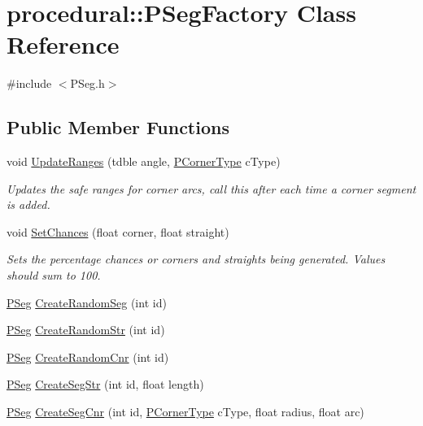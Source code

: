 \hypertarget{classprocedural_1_1_p_seg_factory}{\section{procedural\-:\-:P\-Seg\-Factory Class Reference}
\label{classprocedural_1_1_p_seg_factory}
}


{\ttfamily \#include $<$P\-Seg.\-h$>$}

\subsection*{Public Member Functions}
\begin{DoxyCompactItemize}
\item 
void \hyperlink{classprocedural_1_1_p_seg_factory_a5d5632c1b3713eccc14e1e1c8983492f}{Update\-Ranges} (tdble angle, \hyperlink{namespaceprocedural_ac5486560c59bdf79345a041628149e91}{P\-Corner\-Type} c\-Type)
\begin{DoxyCompactList}\small\item\em Updates the safe ranges for corner arcs, call this after each time a corner segment is added. \end{DoxyCompactList}\item 
void \hyperlink{classprocedural_1_1_p_seg_factory_acfcd1caeae5fdad541a44f18ad1918a3}{Set\-Chances} (float corner, float straight)
\begin{DoxyCompactList}\small\item\em Sets the percentage chances or corners and straights being generated. Values should sum to 100. \end{DoxyCompactList}\item 
\hyperlink{classprocedural_1_1_p_seg}{P\-Seg} \hyperlink{classprocedural_1_1_p_seg_factory_ac53d611538a7b868597f76db25eb1610}{Create\-Random\-Seg} (int id)
\item 
\hyperlink{classprocedural_1_1_p_seg}{P\-Seg} \hyperlink{classprocedural_1_1_p_seg_factory_a4a2f5312bf6f943879b59fcf054c1ad4}{Create\-Random\-Str} (int id)
\item 
\hyperlink{classprocedural_1_1_p_seg}{P\-Seg} \hyperlink{classprocedural_1_1_p_seg_factory_ae2efb7535a7c0bc6b22bdb2e714c2ede}{Create\-Random\-Cnr} (int id)
\item 
\hyperlink{classprocedural_1_1_p_seg}{P\-Seg} \hyperlink{classprocedural_1_1_p_seg_factory_a9d87f165b49d4e1d3df730c6b382ad56}{Create\-Seg\-Str} (int id, float length)
\item 
\hyperlink{classprocedural_1_1_p_seg}{P\-Seg} \hyperlink{classprocedural_1_1_p_seg_factory_a45539332ff407b769af010fd4f38c8fe}{Create\-Seg\-Cnr} (int id, \hyperlink{namespaceprocedural_ac5486560c59bdf79345a041628149e91}{P\-Corner\-Type} c\-Type, float radius, float arc)
\end{DoxyCompactItemize}
